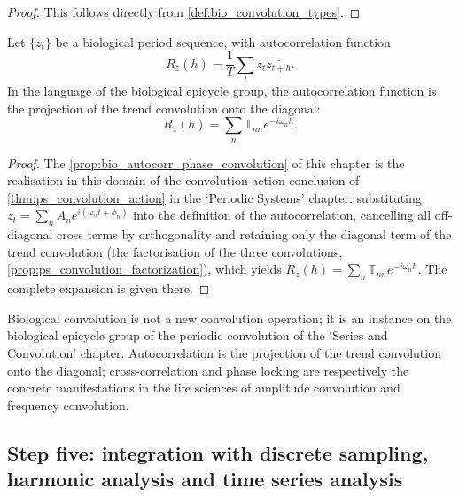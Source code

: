 \begin{proof}
This follows directly from \cref{def:bio_convolution_types}.
\end{proof}

\begin{proposition}\label{prop:bio_autocorr_phase_convolution}
Let $\{z_t\}$ be a biological period sequence, with autocorrelation function
\[
R_z(h)=\frac1T\sum_t z_t\overline{z_{t+h}}.
\]
In the language of the biological epicycle group, the autocorrelation function is the projection of the trend convolution onto the diagonal:
\[
R_z(h)=\sum_n\mathbb T_{nn}e^{-i\omega_n h}.
\]
\end{proposition}

\begin{proof}
The \cref{prop:bio_autocorr_phase_convolution} of this chapter is the realisation in this domain of the convolution-action conclusion of \cref{thm:ps_convolution_action} in the `Periodic Systems' chapter:
substituting $z_t=\sum_n A_n e^{i(\omega_n t+\phi_n)}$ into the definition of the autocorrelation, cancelling all off-diagonal cross terms by orthogonality and retaining only the diagonal term of the trend convolution
(the factorisation of the three convolutions, \cref{prop:ps_convolution_factorization}), which yields $R_z(h)=\sum_n\mathbb T_{nn}e^{-i\omega_n h}$.
The complete expansion is given there.
\end{proof}

\begin{remark}\label{rem:bio_convolution_relation}
Biological convolution is not a new convolution operation; it is an instance on the biological epicycle group of the periodic convolution of the `Series and Convolution' chapter. Autocorrelation is the projection of the trend convolution onto the diagonal; cross-correlation and phase locking are respectively the concrete manifestations in the life sciences of amplitude convolution and frequency convolution.
\end{remark}

\subsection{Step five: integration with discrete sampling, harmonic analysis and time series analysis}

